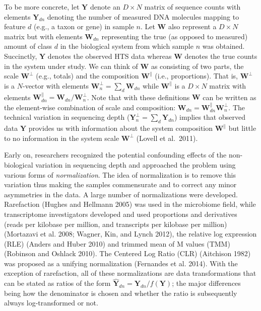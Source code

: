\documentclass[
]{article}
\begin{document}
To be more concrete, let \(\mathbf{Y}\) denote an \(D \times N\) matrix
of sequence counts with elements \(\mathbf{Y}_{dn}\) denoting the number
of measured DNA molecules mapping to feature \(d\) (e.g., a taxon or
gene) in sample \(n\). Let \(\mathbf{W}\) also represent a
\(D \times N\) matrix but with elements \(\mathbf{W}_{dn}\) representing
the true (as opposed to measured) amount of class \(d\) in the
biological system from which sample \(n\) was obtained. Succinctly,
\(\mathbf{Y}\) denotes the observed HTS data whereas \(\mathbf{W}\)
denotes the true counts in the system under study. We can think of
\(\mathbf{W}\) as consisting of two parts, the scale
\(\mathbf{W}^{\perp}\) (e.g., totals) and the composition
\(\mathbf{W}^{\parallel}\) (i.e., proportions). That is,
\(\mathbf{W}^{\perp}\) is a \(N\)-vector with elements
\(\mathbf{W}^{\perp}_{n}=\sum_{d}\mathbf{W}_{dn}\) while
\(\mathbf{W}^{\parallel}\) is a \(D \times N\) matrix with elements
\(\mathbf{W}^{\parallel}_{dn}=\mathbf{W}_{dn}/\mathbf{W}^{\perp}_{n}\).
Note that with these definitions \(\mathbf{W}\) can be written as the
element-wise combination of scale and composition:
\(\mathbf{W}_{dn}=\mathbf{W}^{\parallel}_{dn}\mathbf{W}^{\perp}_{n}\).
The technical variation in sequencing depth
(\(\mathbf{Y}^{\perp}_{n}=\sum_{d}\mathbf{Y}_{dn}\)) implies that
observed data \(\mathbf{Y}\) provides us with information about the
system composition \(\mathbf{W}^{\parallel}\) but little to no
information in the system scale \(\mathbf{W}^{\perp}\) (Lovell et
al.~2011).

Early on, researchers recognized the potential confounding effects of
the non-biological variation in sequencing depth and approached the
problem using various forms of \textit{normalization}. The idea of
normalization is to remove this variation thus making the samples
commensurate and to correct any minor asymmetries in the data. A large
number of normalizations were developed. Rarefaction (Hughes and
Hellmann 2005) was used in the microbiome field, while transcriptome
investigators developed and used proportions and derivatives (reads per
kilobase per million, and transcripts per kilobase per million)
(Mortazavi et al. 2008; Wagner, Kin, and Lynch 2012), the relative log
expression (RLE) (Anders and Huber 2010) and trimmed mean of M values
(TMM) (Robinson and Oshlack 2010). The Centered Log Ratio (CLR)
(Aitchison 1982) was proposed as a unifying normalization (Fernandes et
al. 2014). With the exception of rarefaction, all of these
normalizations are data transformations that can be stated as ratios of
the form \(\hat{\mathbf{Y}}_{dn}=\mathbf{Y}_{dn}/f(\mathbf{Y})\); the
major differences being how the denominator is chosen and whether the
ratio is subsequently always log-transformed or not.
\end{document}
